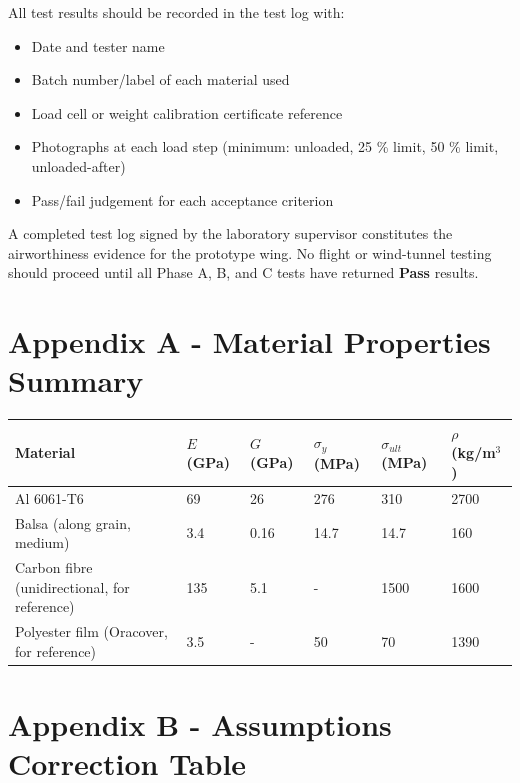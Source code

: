 \documentclass[10pt,a4paper]{article}
\begin{document}
All test results should be recorded in the test log with:
\begin{itemize}[noitemsep,topsep=2pt]
\item Date and tester name
\item Batch number/label of each material used
\item Load cell or weight calibration certificate reference
\item Photographs at each load step (minimum: unloaded, 25 \% limit, 50 \% limit, unloaded-after)
\item Pass/fail judgement for each acceptance criterion
\end{itemize}

A completed test log signed by the laboratory supervisor constitutes the airworthiness evidence for the prototype wing. No flight or wind-tunnel testing should proceed until all Phase A, B, and C tests have returned \textbf{Pass} results.

\newpage 

\appendix
\section{Appendix A - Material Properties Summary}

\begin{center}
\renewcommand{\arraystretch}{1.2}
\begin{tabularx}{\textwidth}{|X|p{1.5cm}|p{1.5cm}|p{2cm}|p{2cm}|p{2cm}|}
\hline
Material & $E$ (GPa) & $G$ (GPa) & $\sigma_y$ (MPa) & $\sigma_{ult}$ (MPa) & $\rho$ (kg/m$^{3}$) \\
\hline
Al 6061-T6 & 69 & 26 & 276 & 310 & 2700 \\
\hline
Balsa (along grain, medium) & 3.4 & 0.16 & 14.7 & 14.7 & 160 \\
\hline
Carbon fibre (unidirectional, for reference) & 135 & 5.1 & - & 1500 & 1600 \\
\hline
Polyester film (Oracover, for reference) & 3.5 & - & 50 & 70 & 1390 \\
\hline
\end{tabularx}
\end{center}

\newpage \section{Appendix B - Assumptions Correction Table}
\end{document}
